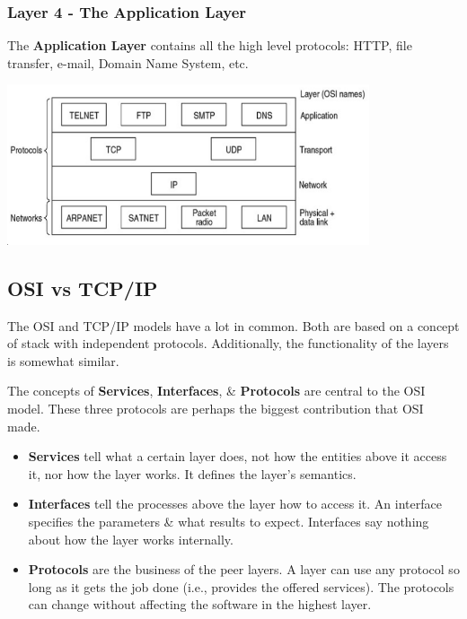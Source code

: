 \documentclass[11pt]{article}
\begin{document}
\subsubsection{Layer 4 - The Application Layer} 
The \textbf{Application Layer} contains all the high level protocols: HTTP, file transfer, e-mail, Domain Name System, etc. 

\begin{center}
    \includegraphics[width=0.8\textwidth]{applicationlayer.png}
\end{center}

\subsection{OSI vs TCP/IP}
The OSI and TCP/IP models have a lot in common. 
Both are based on a concept of stack with independent protocols. 
Additionally, the functionality of the layers is somewhat similar. 


The concepts of \textbf{Services}, \textbf{Interfaces}, \& \textbf{Protocols} are central to the OSI model. 
These three protocols are perhaps the biggest contribution that OSI made.
\begin{itemize}
    \item   \textbf{Services} tell what a certain layer does, not how the entities above it access it, nor how the layer works. 
            It defines the layer's semantics. 
    \item   \textbf{Interfaces} tell the processes above the layer how to access it. 
            An interface specifies the parameters \& what results to expect. 
            Interfaces say nothing about how the layer works internally. 
    \item   \textbf{Protocols} are the business of the peer layers. 
            A layer can use any protocol so long as it gets the job done (i.e., provides the offered services). 
            The protocols can change without affecting the software in the highest layer.
\end{itemize}
\end{document}
